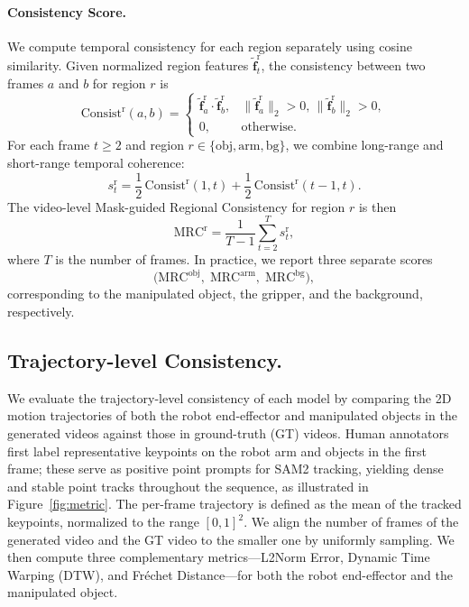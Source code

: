 \paragraph{Consistency Score.}
We compute temporal consistency for each region separately using cosine similarity.  
Given normalized region features $\tilde{\mathbf{f}}^\mathrm{r}_t$, the consistency between two frames $a$ and $b$ for region $r$ is
\[
\mathrm{Consist}^\mathrm{r}(a,b) =
\begin{cases}
\tilde{\mathbf{f}}^\mathrm{r}_a \cdot \tilde{\mathbf{f}}^\mathrm{r}_b, & 
\|\tilde{\mathbf{f}}^\mathrm{r}_a\|_2 > 0,\, \|\tilde{\mathbf{f}}^\mathrm{r}_b\|_2 > 0, \\
0, & \text{otherwise.}
\end{cases}
\]
\noindent
For each frame $t \ge 2$ and region $r \in \{\mathrm{obj},\mathrm{arm},\mathrm{bg}\}$, we combine long-range and short-range temporal coherence:
\[
s^\mathrm{r}_t 
= \frac{1}{2}\,\mathrm{Consist}^\mathrm{r}(1,t)
+ \frac{1}{2}\,\mathrm{Consist}^\mathrm{r}(t-1,t).
\]
\noindent
The video-level Mask-guided Regional Consistency for region $r$ is then
\[
\mathrm{MRC}^\mathrm{r} = \frac{1}{T-1} \sum_{t=2}^{T} s^\mathrm{r}_t,
\]
where $T$ is the number of frames.  
In practice, we report three separate scores
\[
\bigl(\mathrm{MRC}^\mathrm{obj},\; \mathrm{MRC}^\mathrm{arm},\; \mathrm{MRC}^\mathrm{bg}\bigr),
\]
corresponding to the manipulated object, the gripper, and the background, respectively.

\subsection{Trajectory-level Consistency.}
We evaluate the trajectory-level consistency of each model by comparing the 2D motion trajectories of both the robot end-effector and manipulated objects in the generated videos against those in ground-truth (GT) videos. Human annotators first label representative keypoints on the robot arm and objects in the first frame; these serve as positive point prompts for SAM2 tracking, yielding dense and stable point tracks throughout the sequence, as illustrated in Figure~\ref{fig:metric}. The per-frame trajectory is defined as the mean of the tracked keypoints, normalized to the range $[0,1]^2$. We align the number of frames of the generated video and the GT video to the smaller one by uniformly sampling. We then compute three complementary metrics—L2Norm Error, Dynamic Time Warping (DTW), and Fréchet Distance—for both the robot end-effector and the manipulated object.


